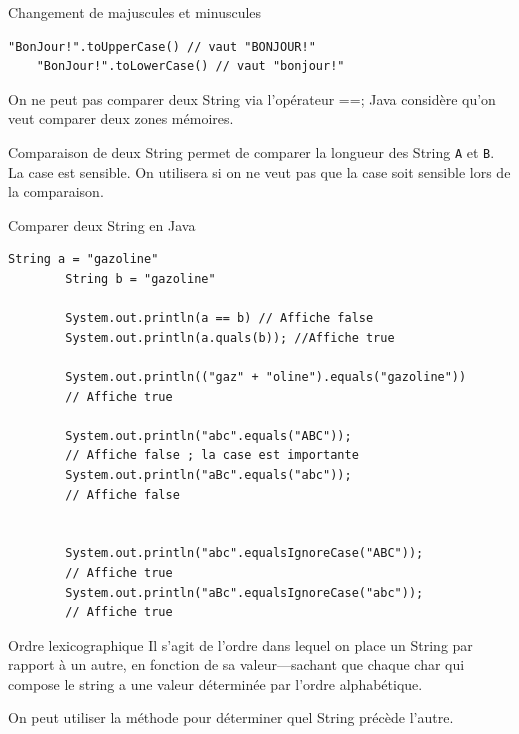 \documentclass{report}
\begin{document}
\begin{EExample*}{Changement de majuscules et minuscules}{}
\begin{lstlisting}[style=JavaDraculaWhite]
	"BonJour!".toUpperCase() // vaut "BONJOUR!"
    "BonJour!".toLowerCase() // vaut "bonjour!"
\end{lstlisting}
\end{EExample*}

\begin{note}
On ne peut pas comparer deux String via l'opérateur ==; Java
considère qu'on veut comparer deux zones mémoires. 
\end{note}

\begin{Syntaxe*}{Comparaison de deux String}{}
 permet de comparer la longueur des String \texttt{\footnotesize{A}} et \texttt{\footnotesize{B}}. La case est sensible.
On utilisera  si on ne veut pas que la case soit sensible lors
de la comparaison. 
\end{Syntaxe*}


\begin{EExample*}{Comparer deux String en Java}{}
	\begin{lstlisting}[style=JavaDraculaWhite]
		String a = "gazoline"
        String b = "gazoline"

        System.out.println(a == b) // Affiche false
		System.out.println(a.quals(b)); //Affiche true
	
		System.out.println(("gaz" + "oline").equals("gazoline"))
		// Affiche true

		System.out.println("abc".equals("ABC"));
		// Affiche false ; la case est importante
		System.out.println("aBc".equals("abc"));
		// Affiche false


		System.out.println("abc".equalsIgnoreCase("ABC"));
		// Affiche true
		System.out.println("aBc".equalsIgnoreCase("abc"));
		// Affiche true
	\end{lstlisting}
\end{EExample*}

\begin{DefG*}{Ordre lexicographique}{}
Il s'agit de l'ordre dans lequel on place un String par 
rapport à un autre, en fonction de sa valeur—sachant que chaque char qui compose le string a une valeur déterminée par l'ordre alphabétique. 
\end{DefG*}

\begin{note}
On peut utiliser la méthode  pour déterminer quel String précède l'autre.
\end{note}
\end{document}
